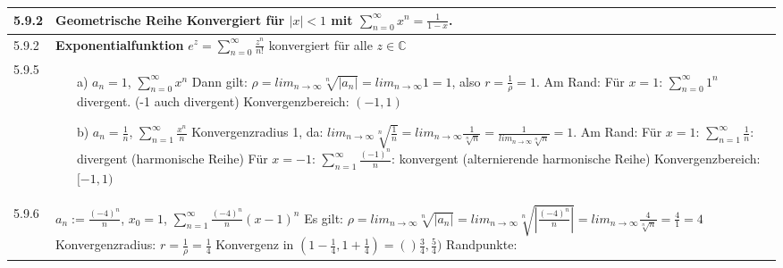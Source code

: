     \begin{longtable}{p{1cm} p{16cm}}
        \toprule

        5.9.2 & \textbf{Geometrische Reihe} \hfill \break 
                Konvergiert für $|x| < 1$ mit $\sum^{\infty}_{n=0} x^n = \frac{1}{1-x}$. \\
        \midrule
        5.9.2 & \textbf{Exponentialfunktion} \hfill \break
                $e^z = \sum^{\infty}_{n=0} \frac{z^n}{n!}$ konvergiert für alle $z \in \mathbb{C}$ \\ 
        \midrule
        5.9.5 & \begin{itemize}[topsep=-0.5cm]
                    \item[a)] $a_n = 1$, $\sum^{\infty}_{n=0} x^n$ \hfill \break
                                Dann gilt: $\rho = lim_{n \rightarrow \infty} \sqrt[n]{|a_n|} = lim_{n \rightarrow \infty} 1 = 1$, also $r = \frac{1}{\rho} = 1$. \hfill \break
                                Am Rand: Für $x=1$: $\sum^{\infty}_{n=0} 1^n$ divergent. (-1 auch divergent) \hfill \break
                                Konvergenzbereich: $(-1,1)$
                    \item[b)] $a_n = \frac{1}{n}$, $\sum^{\infty}_{n=1} \frac{x^n}{n}$ \hfill \break
                                Konvergenzradius 1, da: $lim_{n \rightarrow \infty} \sqrt[n]{\frac{1}{n}} = lim_{n \rightarrow \infty} \frac{1}{\sqrt[n]{n}}
                                = \frac{1}{lim_{n \rightarrow \infty} \sqrt[n]{n}} = 1$. \hfill \break
                                Am Rand: Für $x=1$: $\sum^{\infty}_{n=1} \frac{1}{n}$: divergent (harmonische Reihe) \hfill \break
                                Für $x=-1$: $\sum^{\infty}_{n=1} \frac{(-1)^n}{n}$: konvergent (alternierende harmonische Reihe) \hfill \break
                                Konvergenzbereich: $[-1,1)$
                \end{itemize} \vspace{-0cm} \\
        \midrule
        5.9.6 & $a_n := \frac{(-4)^n}{n}$, $x_0 = 1$, $\sum^{\infty}_{n=1} \frac{(-4)^n}{n}(x-1)^n$ \hfill \break
                Es gilt: $\rho = lim_{n \rightarrow \infty} \sqrt[n]{|a_n|} = lim_{n \rightarrow \infty} \sqrt[n]{|\frac{(-4)^n}{n}|} =
                lim_{n \rightarrow \infty} \frac{4}{\sqrt[n]{n}} = \frac{4}{1} = 4$ \hfill \break 
                Konvergenzradius: $r = \frac{1}{\rho} = \frac{1}{4}$ \hfill \break
                Konvergenz in $(1- \frac{1}{4}, 1 + \frac{1}{4}) = ()\frac{3}{4}, \frac{5}{4})$ \hfill \break
                Randpunkte: \hfill \break

\end{longtable}
